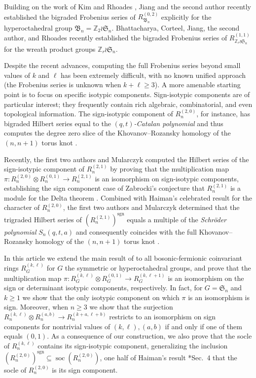 \documentclass[11pt, reqno]{amsart}
\theoremstyle{definition}
\theoremstyle{remark}
\numberwithin{equation}{section}
\newcommand{\0}{\emptyset}
\newcommand{\Z}{\mathbb{Z}}
\renewcommand{\S}{\mathfrak{S}}
\DeclareMathOperator{\sgn}{sgn}
\DeclareMathOperator{\soc}{soc}
\begin{document}
Building on the work of Kim and Rhoades \cite{KimRhoades2022}, Jiang and the second author \cite{JiangLentfer} recently established the bigraded Frobenius series of $R_{\mathfrak{B}_n}^{(0,2)}$ explicitly for the hyperoctahedral group $\mathfrak{B}_n = \Z_2 \wr \S_n$. Bhattacharya, Corteel, Jiang, the second author, and Rhoades \cite{BCJLR} recently established the bigraded Frobenius series of $R_{\Z_r \wr \S_n}^{(1,1)}$ for the wreath product groups $\Z_r \wr \S_n$.

Despite the recent advances, computing the full Frobenius series beyond small values of $k$ and $\ell$ has been extremely difficult, with no known unified approach (the Frobenius series is unknown when $k + \ell \geq 3$). 
A more amenable starting point is to focus on specific isotypic components. 
Sign-isotypic components are of particular interest; they frequently contain rich algebraic, combinatorial, and even topological information. 
The sign-isotypic component of $R_n^{(2,0)}$, for instance, has bigraded Hilbert series equal to the \emph{$(q,t)$-Catalan polynomial} and thus computes the degree zero slice of the Khovanov--Rozansky homology of the $(n,n+1)$ torus knot \cite{Hog17}. 

Recently, the first two authors and Mularczyk \cite{GLM} computed the Hilbert series of the sign-isotypic component of $R_n^{(2,1)}$ by proving that the multiplication map $\pi: R_n^{(2,0)} \otimes R_n^{(0,1)} \to R_n^{(2,1)}$ is an isomorphism on sign-isotypic components, establishing the sign component case of Zabrocki's conjecture \cite{Zabrocki2019} that $R_n^{(2,1)}$ is a module for the Delta theorem \cites{HaglundRemmelWilson2018, DAdderioMellit, BHMPS-Delta}. Combined with Haiman's celebrated result for the character of $R_n^{(2,0)}$, the first two authors and Mularczyk determined that the trigraded Hilbert series of $(R_n^{(2,1)})^{\sgn}$ equals a multiple of the \emph{Schr\"oder polynomial} $S_n(q,t,a)$ and consequently coincides with the full Khovanov--Rozansky homology of the $(n,n+1)$ torus knot \cites{GorskyMellit, Hog17}. 

In this article we extend the main result of \cite{GLM} to all bosonic-fermionic coinvariant rings 
$R_G^{(k,\ell)}$ for $G$ the symmetric or hyperoctahedral groups, and prove that the multiplication map 
$\pi: R_G^{(k,\ell)} \otimes R_G^{(0,1)} \to R_G^{(k,\ell+1)}$ is an isomorphism on the sign or determinant isotypic components, respectively. 
In fact, for $G=\S_n$ and $k \geq 1$ we show that the only isotypic component on which $\pi$ is an isomorphism is sign.
Moreover, when $n\geq 3$ we show that the surjection $R_n^{(k,\ell)} \otimes R_n^{(a,b)} \to R_n^{(k+a,\ell+b)}$ restricts to an isomorphism on sign components for nontrivial values of $(k,\ell), (a,b)$ if and only if one of them equals $(0,1)$. 
As a consequence of our construction, 
we also prove that the socle of $R_n^{(k,\ell)}$ contains its sign-isotypic component, 
generalizing the inclusion $(R_n^{(2,0)})^{\sgn} \subseteq \soc(R_n^{(2,0)})$, 
one half of Haiman's result \cite{Haiman2002}*{Sec.~4} that 
the socle of $R_n^{(2,0)}$ is its sign component. 
\end{document}
